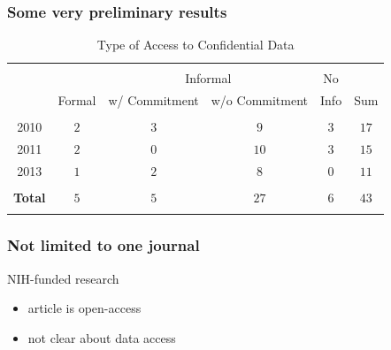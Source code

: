 \begin{frame}
	\frametitle{Some very preliminary results}
	\begin{table}[!htbp] \centering 
		\caption{Type of Access to Confidential Data} 
		\label{} 
		\begin{tabular}{ cccccc} 
			\\[-1.8ex]\hline 
			\hline \\[-1.8ex] 
			&  &\multicolumn{2}{c}{Informal} & No  &  \\ 
			& Formal & w/ Commitment & w/o Commitment &  Info & Sum \\ 
			\hline \\[-1.8ex] 
			2010 & $2$ & $3$ & $9$ & $3$ & $17$ \\ 
			2011 & $2$ & $0$ & $10$ & $3$ & $15$ \\ 
			2013 & $1$ & $2$ & $8$ & $0$ & $11$ \\ 
			\hline \\[-1.8ex] 
			\bf	Total & $5$ & $5$ & $27$ & $6$ & $43$ \\ 
			\hline \\[-1.8ex] 
		\end{tabular} 
	\end{table} 
\end{frame}



\begin{frame}
	\frametitle{Not limited to one journal}
	\begin{block}{NIH-funded research}
		\begin{itemize}
			\item article is open-access
			\item not clear about data access
		\end{itemize}
	\end{block}
\end{frame}

